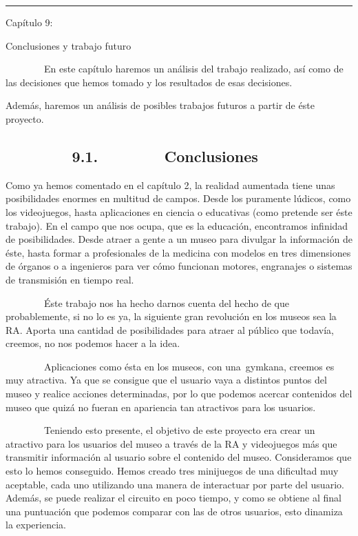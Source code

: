 \begin{center}\rule{3in}{0.4pt}\end{center}

Capítulo 9:

Conclusiones y trabajo futuro

~~~~~~~~En este capítulo haremos un análisis del trabajo realizado, así
como de las decisiones que hemos tomado y los resultados de esas
decisiones.

Además, haremos un análisis de posibles trabajos futuros a partir de
éste proyecto.

\subsection{~~~~~~~~9.1.~~~~~~~~Conclusiones}\label{conclusiones-1}

Como ya hemos comentado en el capítulo 2, la realidad aumentada tiene
unas posibilidades enormes en multitud de campos. Desde los puramente
lúdicos, como los videojuegos, hasta aplicaciones en ciencia o
educativas (como pretende ser éste trabajo). En el campo que nos ocupa,
que es la educación, encontramos infinidad de posibilidades. Desde
atraer a gente a un museo para divulgar la información de éste, hasta
formar a profesionales de la medicina con modelos en tres dimensiones de
órganos o a ingenieros para ver cómo funcionan motores, engranajes o
sistemas de transmisión en tiempo real.

~~~~~~~~Éste trabajo nos ha hecho darnos cuenta del hecho de que
probablemente, si no lo es ya, la siguiente gran revolución en los
museos sea la RA. Aporta una cantidad de posibilidades para atraer al
público que todavía, creemos, no nos podemos hacer a la idea.

~~~~~~~~Aplicaciones como ésta en los museos, con una~gymkana, creemos
es muy atractiva. Ya que se consigue que el usuario vaya a distintos
puntos del museo y realice acciones determinadas, por lo que podemos
acercar contenidos del museo que quizá no fueran en apariencia tan
atractivos para los usuarios.

~~~~~~~~Teniendo esto presente, el objetivo de este proyecto era crear
un atractivo para los usuarios del museo a través de la RA y videojuegos
más que transmitir información al usuario sobre el contenido del museo.
Consideramos que esto lo hemos conseguido. Hemos creado tres minijuegos
de una dificultad muy aceptable, cada uno utilizando una manera de
interactuar por parte del usuario. Además, se puede realizar el circuito
en poco tiempo, y como se obtiene al final una puntuación que podemos
comparar con las de otros usuarios, esto dinamiza la experiencia.

